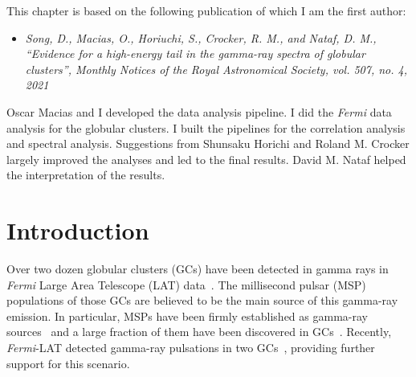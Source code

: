 \documentclass[doublespace,nopageskip]{VTthesis} %
\begin{document}
This chapter is based on the following publication of which I am the first author:
\begin{itemize}
    \item \emph{Song, D., Macias, O., Horiuchi, S., Crocker, R. M., and Nataf, D. M., “Evidence for a high-energy tail in the gamma-ray spectra of globular clusters”, Monthly Notices of the Royal Astronomical Society, vol. 507, no. 4, 2021}
\end{itemize}
Oscar Macias and I developed the data analysis pipeline. I did the \textit{Fermi} data analysis for the globular clusters. I built the pipelines for the correlation analysis and spectral analysis. Suggestions from Shunsaku Horichi and Roland M. Crocker largely improved the analyses and led to the final results. David M. Nataf helped the interpretation of the results.

\section{Introduction}\label{sec:intro}

Over two dozen globular clusters (GCs) have been detected in gamma rays in {\it Fermi} Large Area Telescope (LAT) data~\citep{2009Sci...325..845A,2010A&A...524A..75A,2010ApJ...712L..36K,2011ApJ...729...90T,2015MNRAS.448.3215Z,2016MNRAS.459...99Z}. The millisecond pulsar (MSP) populations of those GCs are believed to be the main source of this gamma-ray emission. In particular, MSPs have been firmly established as gamma-ray sources~\citep{1996A&A...311L...9V,2009ApJ...699.1171A,2013MNRAS.430..571E,2013ApJS..208...17A} and a large fraction of them have been discovered in GCs~\citep{2005ASPC..328..147C}. Recently, \textit{Fermi}-LAT detected gamma-ray pulsations in two GCs~\citep{2011Sci...334.1107F,2013ApJ...778..106J}, providing further support for this scenario.
\end{document}
